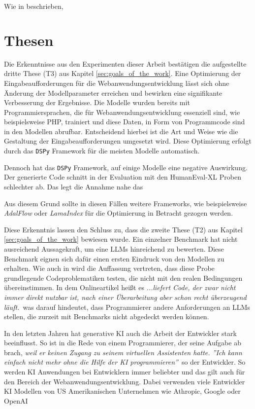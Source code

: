 Wie in \cite{hartenstein_2024} beschrieben,
\section{Thesen}
Die Erkenntnisse aus den Experimenten dieser Arbeit bestätigen die aufgestellte dritte These (T3) aus Kapitel \ref{sec:goals_of_the_work}. Eine Optimierung der Eingabeaufforderungen für die Webanwendungsentwicklung lässt sich ohne Änderung der Modellparameter erreichen und bewirken eine signifikante Verbesserung der Ergebnisse. Die Modelle wurden bereits mit Programmiersprachen, die für Webanwendungsentwicklung essenziell sind, wie beispielsweise PHP, trainiert und diese Daten, in Form von Programmcode sind in den Modellen abrufbar. Entscheidend hierbei ist die Art und Weise wie die Gestaltung der Eingabeaufforderungen umgesetzt wird. Diese Optimierung erfolgt durch das \texttt{DSPy} Framework für die meisten Modelle automatisch.\vspace{0.2cm}

Dennoch hat das \texttt{DSPy} Framework, auf einige Modelle eine negative Auswirkung. Der generierte Code schnitt in der Evaluation mit den HumanEval-XL Proben schlechter ab. Das legt die Annahme nahe das  

Aus diesem Grund sollte in diesen Fällen weitere Frameworks, wie beispielsweise \textit{AdalFlow} oder \textit{LamaIndex} für die Optimierung in Betracht gezogen werden.\vspace{0.2cm}

Diese Erkenntnis lassen den Schluss zu, dass die zweite These (T2) aus Kapitel \ref{sec:goals_of_the_work} bewiesen wurde. Ein einzelner Benchmark hat nicht ausreichend Aussagekraft, um eine LLMs hinreichend zu bewerten. Diese Benchmark eignen sich dafür einen ersten Eindruck von den Modellen zu erhalten. Wie auch in \cite{zhang-2024} wird die Auffassung vertreten, dass diese Probe grundlegende Codeproblematiken testen, die nicht mit den realen Bedingungen übereinstimmen. In dem Onlineartikel \cite{albrecht-2023} heißt es \glqq \textit{...liefert Code, der zwar nicht immer direkt nutzbar ist, nach einer Überarbeitung aber schon recht überzeugend läuft.}\grqq \ was darauf hindeutet, dass Programmierer andere Anforderungen an LLMs stellen, die zurzeit mit Benchmarks nicht abgedeckt werden können.\vspace{0.2cm}

In den letzten Jahren hat generative KI auch die Arbeit der Entwickler stark beeinflusst. So ist in \cite{focus-online-2025} die Rede von einem Programmierer, der seine Aufgabe ab brach, \glqq \textit{weil er keinen Zugang zu seinem virtuellen Assistenten hatte. ''Ich kann einfach nicht mehr ohne die Hilfe der KI programmieren''}\grqq \ so der Entwickler. So werden KI Anwendungen bei Entwicklern immer beliebter und das gilt auch für den Bereich der Webanwendungsentwicklung. Dabei verwenden viele Entwickler KI Modellen von US Amerikanischen Unternehmen wie Athropic, Google oder OpenAI

